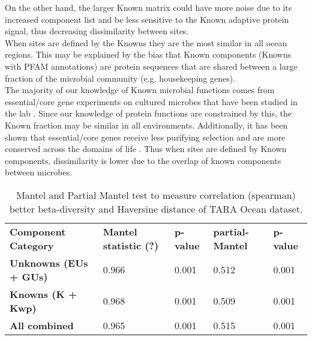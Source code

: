 On the other hand, the larger Known matrix could have more noise due to its increased component list and be less sensitive to the Known adaptive protein signal, thus decreasing dissimilarity between sites.\\

When sites are defined by the Knowns they are the most similar in all ocean regions. This may be explained by the bias that Known components (Knowns with PFAM annotations) are protein sequences that are shared between a large fraction of the microbial community (e.g. housekeeping genes).\\

The majority of our knowledge of Known microbial functions comes from essential/core gene experiments on cultured microbes that have been studied in the lab \citep{Bernard_2018}. Since our knowledge of protein functions are constrained by this, the Known fraction may be similar in all environments. Additionally, it has been shown that essential/core genes receive less purifying selection and are more conserved across the domains of life \citep{Jordan_2002}. Thus when sites are defined by Known components, dissimilarity is lower due to the overlap of known components between microbes.\\

\begin{table}[]
\centering
\caption{Mantel and Partial Mantel test to measure correlation (spearman) better beta-diversity and Haversine distance of TARA Ocean dataset.}
\label{my-label}
\begin{tabular}{lllll}
\textbf{Component Category}   & \textbf{Mantel statistic (?)} & \textbf{p-value} & \textbf{partial-Mantel} & \textbf{p-value} \\
\textbf{Unknowns (EUs + GUs)} & 0.966                         & 0.001            & 0.512                   & 0.001            \\
\textbf{Knowns (K + Kwp)}     & 0.968                         & 0.001            & 0.509                   & 0.001            \\
\textbf{All combined}         & 0.965                         & 0.001            & 0.515                   & 0.001           
\end{tabular}
\end{table}


